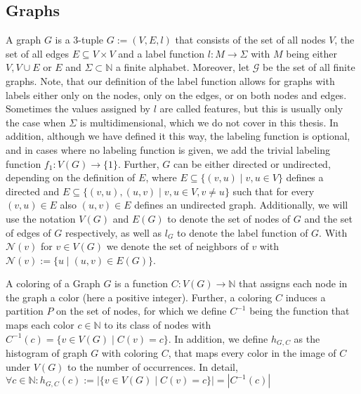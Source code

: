 \documentclass[11pt, dvipsnames, DIV=12]{scrreprt}
\theoremstyle{definition}
\begin{document}
\subsection{Graphs}
A graph $G$ is a 3-tuple $G:= (V, E, l)$ that consists of the set of all nodes $V$, the set of all edges $E \subseteq V \times V$ and a label function $l: M \rightarrow \Sigma$ with $M$ being either $V, V \cup E$ or $E$ and $\Sigma \subset \mathbb{N}$ a finite alphabet. Moreover, let $\mathcal{G}$ be the set of all finite graphs. Note, that our definition of the label function allows for graphs with labels either only on the nodes, only on the edges, or on both nodes and edges. Sometimes the values assigned by $l$ are called features, but this is usually only the case when $\Sigma$ is multidimensional, which we do not cover in this thesis. In addition, although we have defined it this way, the labeling function is optional, and in cases where no labeling function is given, we add the trivial labeling function $f_1: V(G) \rightarrow \{1\}$. Further, $G$ can be either directed or undirected, depending on the definition of $E$, where $E \subseteq \{(v,u) \mid v,u \in V\}$ defines a directed and $E \subseteq \{(v, u), (u,v) \mid v,u \in V, v\neq u\}$ such that for every $(v,u) \in E$ also $(u,v) \in E$ defines an undirected graph. Additionally, we will use the notation $V(G)$ and $E(G)$ to denote the set of nodes of $G$ and the set of edges of $G$ respectively, as well as $l_G$ to denote the label function of $G$. With $\mathcal{N}(v)$ for $v \in V(G)$ we denote the set of neighbors of $v$ with $\mathcal{N}(v) := \{u \mid (u, v) \in E(G)\}$.

A coloring of a Graph $G$ is a function $C: V(G) \rightarrow \mathbb{N}$ that assigns each node in the graph a color (here a positive integer). Further, a coloring $C$ induces a partition $P$ on the set of nodes, for which we define $C^{-1}$ being the function that maps each color $c \in \mathbb{N}$ to its class of nodes with $C^{-1}(c) = \{ v\in V(G) \mid C(v) = c\}$. In addition, we define $h_{G, C}$ as the histogram of graph $G$ with coloring $C$, that maps every color in the image of $C$ under $V(G)$ to the number of occurrences. In detail, $\forall c \in \mathbb{N}: h_{G, C}(c) := | \{ v \in V(G) \mid C(v) = c  \} | = | C^{-1}(c) |$
\end{document}
